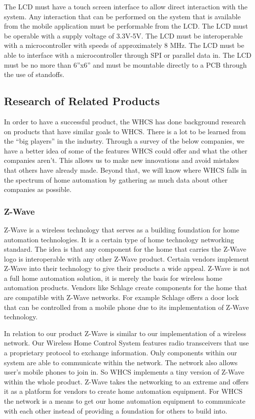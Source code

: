 The LCD must have a touch screen interface to allow direct interaction with the
system. Any interaction that can be performed on the system that is available
from the mobile application must be performable from the LCD. The LCD must be
operable with a supply voltage of 3.3V{}-5V. The LCD must be interoperable with
a microcontroller with speeds of approximately 8 MHz. The LCD must be able to
interface with a microcontroller through SPI or parallel data in. The LCD must
be no more than 6''x6'' and must be mountable directly to a PCB through the use
of standoffs.

\subsection{Research of Related Products}
In order to have a successful product, the WHCS has done background research on
products that have similar goals to WHCS. There is a lot to be learned from the
``big players'' in the industry. Through a survey of the below companies, we
have a better idea of some of the features WHCS could offer and what the other
companies aren't. This allows us to make new innovations and avoid mistakes
that others have already made. Beyond that, we will know where WHCS falls in
the spectrum of home automation by gathering as much data about other companies
as possible.

\subsubsection{Z-Wave}
Z{}-Wave is a wireless technology that serves as a building foundation for home
automation technologies. It is a certain type of home technology networking
standard. The idea is that any component for the home that carries the Z{}-Wave
logo is interoperable with any other Z{}-Wave product. Certain vendors
implement Z{}-Wave into their technology to give their products a wide appeal.
Z{}-Wave is not a full home automation solution, it is merely the basis for
wireless home automation products. Vendors like Schlage create components for
the home that are compatible with Z{}-Wave networks.  For example Schlage
offers a door lock that can be controlled from a mobile phone due to its
implementation of Z{}-Wave technology.

In relation to our product Z{}-Wave is similar to our
implementation of a wireless network. Our Wireless Home Control System 
features radio transceivers that use a proprietary protocol to exchange
information. Only components within our system are able to communicate
within the network. The network also allows user{}'s mobile phones to join
in. So WHCS implements a tiny version of Z{}-Wave within the whole product.
Z{}-Wave takes the networking to an extreme and offers it as a platform for
vendors to create home automation equipment. For WHCS the network is a means to
get our home automation equipment to communicate with each other instead of
providing a foundation for others to build into.


